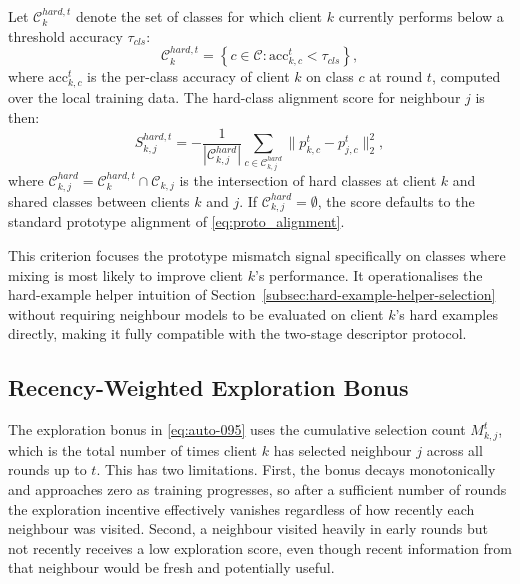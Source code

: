 \documentclass[conference]{IEEEtran}
\begin{document}
Let \(\mathcal{C}_k^{hard,t}\) denote the set of classes for which client \(k\) currently performs below a threshold accuracy \(\tau_{cls}\):
\begin{equation}
    \mathcal{C}_k^{hard,t}
    =
    \left\{
    c \in \mathcal{C} :
    \mathrm{acc}_{k,c}^t < \tau_{cls}
    \right\},
    \label{eq:hard_classes}
\end{equation}
where \(\mathrm{acc}_{k,c}^t\) is the per-class accuracy of client \(k\) on class \(c\) at round \(t\), computed over the local training data. The hard-class alignment score for neighbour \(j\) is then:
\begin{equation}
    S_{k,j}^{hard,t}
    =
    -\frac{1}{|\mathcal{C}_{k,j}^{hard}|}
    \sum_{c \in \mathcal{C}_{k,j}^{hard}}
    \|p_{k,c}^t - p_{j,c}^t\|_2^2,
    \label{eq:hard_class_alignment}
\end{equation}
where \(\mathcal{C}_{k,j}^{hard} = \mathcal{C}_k^{hard,t} \cap \mathcal{C}_{k,j}\) is the intersection of hard classes at client \(k\) and shared classes between clients \(k\) and \(j\). If \(\mathcal{C}_{k,j}^{hard} = \emptyset\), the score defaults to the standard prototype alignment of \eqref{eq:proto_alignment}.

This criterion focuses the prototype mismatch signal specifically on classes where mixing is most likely to improve client \(k\)'s performance. It operationalises the hard-example helper intuition of Section~\ref{subsec:hard-example-helper-selection} without requiring neighbour models to be evaluated on client \(k\)'s hard examples directly, making it fully compatible with the two-stage descriptor protocol.

\subsection{Recency-Weighted Exploration Bonus}
\label{subsec:recency-weighted-exploration}
The exploration bonus in \eqref{eq:auto-095} uses the cumulative selection count \(M_{k,j}^t\), which is the total number of times client \(k\) has selected neighbour \(j\) across all rounds up to \(t\). This has two limitations. First, the bonus decays monotonically and approaches zero as training progresses, so after a sufficient number of rounds the exploration incentive effectively vanishes regardless of how recently each neighbour was visited. Second, a neighbour visited heavily in early rounds but not recently receives a low exploration score, even though recent information from that neighbour would be fresh and potentially useful.
\end{document}
